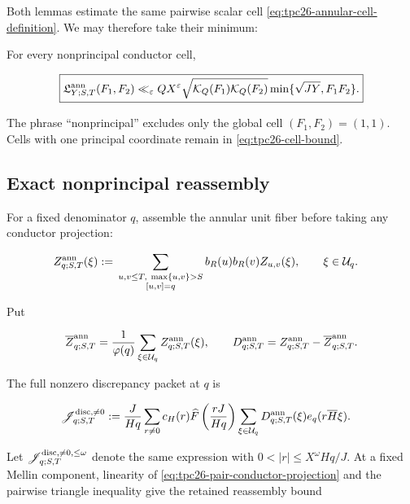Both lemmas estimate the same pairwise scalar cell
\eqref{eq:tpc26-annular-cell-definition}.  We may therefore take their
minimum:

\begin{theorem}
\label{thm:tpc26-cell-bound}
For every nonprincipal conductor cell,

\begin{equation}
 \boxed{
 \mathfrak L^{\rm ann}_{Y;S,T}(F_1,F_2)
 \ll_\varepsilon QX^\varepsilon
 \sqrt{\mathcal K_Q(F_1)\mathcal K_Q(F_2)}
 \min\{\sqrt{JY},F_1F_2\}.}
 \label{eq:tpc26-cell-bound}
\end{equation}
\end{theorem}

The phrase ``nonprincipal'' excludes only the global cell
\((F_1,F_2)=(1,1)\).  Cells with one principal coordinate remain in
\eqref{eq:tpc26-cell-bound}.

\subsection{Exact nonprincipal reassembly}

For a fixed denominator \(q\), assemble the annular unit fiber before
taking any conductor projection:

\begin{align}
 Z_{q;S,T}^{\rm ann}(\xi)
 :={}&
 \sum_{\substack{u,v\le T,\ \max\{u,v\}>S\\
                  [u,v]=q}}
 b_R(u)b_R(v)Z_{u,v}(\xi),
 \qquad \xi\in\mathcal U_q.
 \label{eq:tpc26-assembled-annular-fiber}
\end{align}

Put

\begin{equation}
 \overline Z_{q;S,T}^{\rm ann}
 =\frac1{\varphi(q)}
 \sum_{\xi\in\mathcal U_q}Z_{q;S,T}^{\rm ann}(\xi),
 \qquad
 D_{q;S,T}^{\rm ann}
 =Z_{q;S,T}^{\rm ann}-\overline Z_{q;S,T}^{\rm ann}.
 \label{eq:tpc26-assembled-annular-centering}
\end{equation}

The full nonzero discrepancy packet at \(q\) is

\begin{align}
 \mathscr J_{q;S,T}^{\rm disc,\ne0}
 :={}&\frac{J}{Hq}\sum_{r\ne0}c_H(r)
 \widehat F\left(\frac{rJ}{Hq}\right)
 \sum_{\xi\in\mathcal U_q}D_{q;S,T}^{\rm ann}(\xi)
 e_q(r\overline H\xi).
 \label{eq:tpc26-annular-discrepancy-packet}
\end{align}

Let \(\mathscr J_{q;S,T}^{\rm disc,\ne0,\le\omega}\) denote the same
expression with \(0<|r|\le X^\omega Hq/J\).  At a fixed Mellin
component, linearity of \eqref{eq:tpc26-pair-conductor-projection} and
the pairwise triangle inequality give the retained reassembly bound

